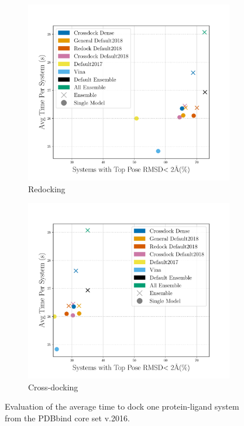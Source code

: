 \documentclass[journal=jcisd8,manuscript=article]{achemso}
\begin{document}
\begin{figure}    
        \begin{subfigure}[b]{0.48\textwidth}
                \centering
                \includegraphics[width=\textwidth]{figures/redocking/gpu_models_line_rescore.pdf}
                \caption{Redocking}
                \label{fig:OptimalRescRD}
        \end{subfigure}    
        \begin{subfigure}[b]{0.48\textwidth}
                \centering
                \includegraphics[width=\textwidth]{figures/crossdocking/gpu_models_line_rescore.pdf}
                \caption{Cross-docking}
                \label{fig:OptimalRescCD}
        \end{subfigure}    
        \caption{Evaluation of the average time to dock one protein-ligand system from the PDBbind core set v.2016.}
        \label{fig:OptimalRescore}
\end{figure}    
\end{document}
